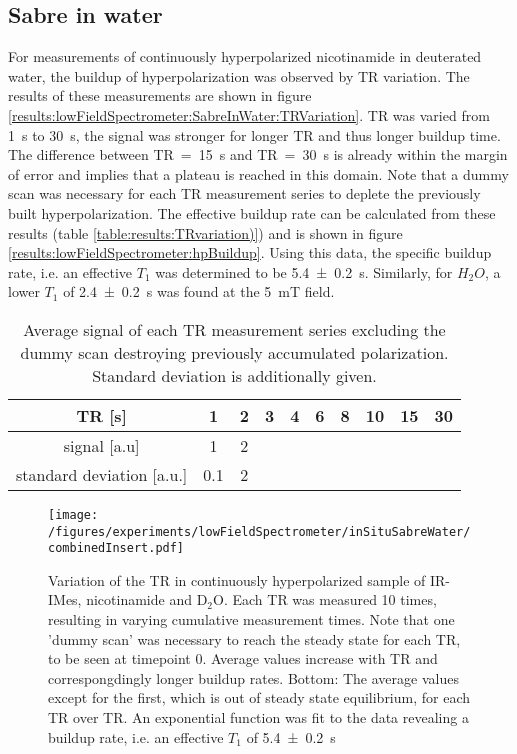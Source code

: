     \subsection{Sabre in water}
    For measurements of continuously hyperpolarized nicotinamide in deuterated water, the buildup of hyperpolarization was observed by TR variation. The results of these measurements are shown in figure \ref{results:lowFieldSpectrometer:SabreInWater:TRVariation}. TR was varied from \SI{1}{\second} to \SI{30}{\second}, the signal was stronger for longer TR and thus longer buildup time. The difference between TR~=~\SI{15}{\second} and TR~=~\SI{30}{\second} is already within the margin of error and implies that a plateau is reached in this domain. Note that a dummy scan was necessary for each TR measurement series to deplete the previously built hyperpolarization. The effective buildup rate can be calculated from these results (table \ref{table:results:TRvariation)}) and is shown in figure \ref{results:lowFieldSpectrometer:hpBuildup}. Using this data, the specific buildup rate, i.e. an effective $T_1$ was determined to be \SI{5.4\pm 0.2}{\second}. Similarly, for $H_2O$, a lower $T_1$ of \SI{2.4\pm0.2}{\second} was found at the \SI{5}{\milli\tesla} field.
        \begin{table}
            \centering
            \begin{tabular}{|c|ccccccccc|}
                \hline
                TR [s] & 1 & 2 & 3 & 4 & 6 & 8 & 10 & 15 & 30 \\
                \hline
                signal [a.u] & 1 & 2\\
                standard deviation [a.u.] & 0.1 & 2\\
                \hline
            \end{tabular}
            \label{table:results:TRvariation}
            \caption{Average signal of each TR measurement series excluding the dummy scan destroying previously accumulated polarization. Standard deviation is additionally given.}
        \end{table}
        \begin{figure}
            \texttt{[image: /figures/experiments/lowFieldSpectrometer/inSituSabreWater/combinedInsert.pdf]}
        \caption{Variation of the TR in continuously hyperpolarized sample of IR-IMes, nicotinamide and D$_2$O. Each TR was measured 10 times, resulting in varying cumulative measurement times. Note that one 'dummy scan' was necessary to reach the steady state for each TR, to be seen at timepoint 0. Average values increase with TR and correspongdingly longer buildup rates. Bottom: The average values except for the first, which is out of steady state equilibrium, for each TR over TR. An exponential function was fit to the data revealing a buildup rate, i.e. an effective $T_1$ of \SI{5.4\pm 0.2}{\second}}
        \end{figure}
